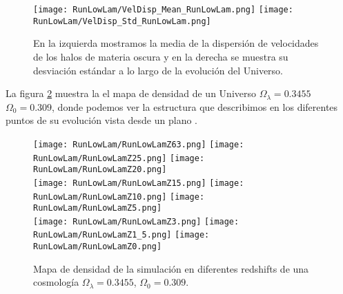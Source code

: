 \begin{figure}[H]
    \centering
    \texttt{[image: RunLowLam/VelDisp\_Mean\_RunLowLam.png]}
    \texttt{[image: RunLowLam/VelDisp\_Std\_RunLowLam.png]}
    \caption[Media y desviación estándar de la dispersión de velocidades de un Universo $\Omega_\lambda = 0.3455$, $\Omega_0 = 0.309$]{\footnotesize En la izquierda mostramos la media de la dispersión de velocidades de los halos de materia oscura y en la derecha se muestra su desviación estándar a lo largo de la evolución del Universo.}
    \label{fig:LowLam-VelDispStats}
\end{figure}

La figura \ref{fig:LowLam-DensityMap} muestra la el mapa de densidad de un Universo $\Omega_\lambda = 0.3455$ $\Omega_0 = 0.309$, donde podemos ver la estructura que describimos  en los diferentes puntos de su evolución vista desde un plano .
\begin{figure}[H]
    \centering

    \texttt{[image: RunLowLam/RunLowLamZ63.png]}   %
    \texttt{[image: RunLowLam/RunLowLamZ25.png]}   %
    \texttt{[image: RunLowLam/RunLowLamZ20.png]}   %
    \\
    \texttt{[image: RunLowLam/RunLowLamZ15.png]}   %
    \texttt{[image: RunLowLam/RunLowLamZ10.png]}   %
    \texttt{[image: RunLowLam/RunLowLamZ5.png]}    %
    \\
    \texttt{[image: RunLowLam/RunLowLamZ3.png]}    %
    \texttt{[image: RunLowLam/RunLowLamZ1\_5.png]}  %
    \texttt{[image: RunLowLam/RunLowLamZ0.png]}    %
    \caption[Mapa de densidad de un Universo $\Omega_\lambda = 0.3455$, $\Omega_0 = 0.309$ en en diferentes redshift]{ \footnotesize Mapa de densidad de la simulación en diferentes redshifts de una cosmología $\Omega_\lambda = 0.3455$, $\Omega_0 = 0.309$. }
    \label{fig:LowLam-DensityMap}
\end{figure}